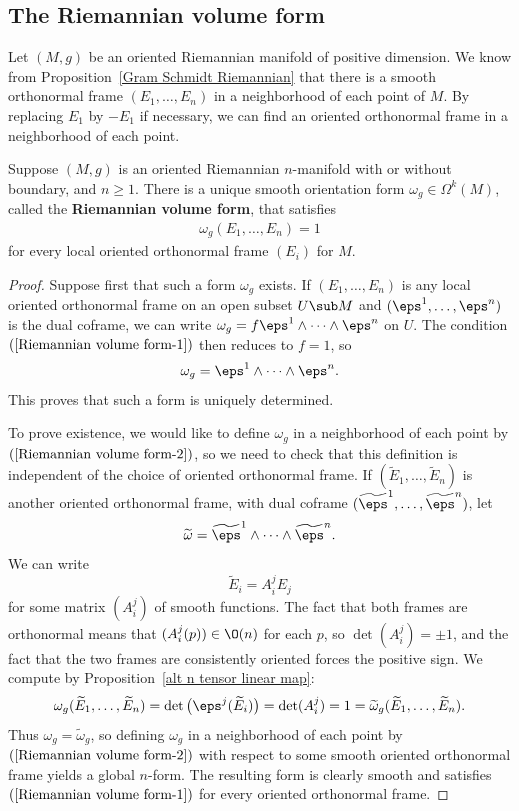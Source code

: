 \subsection{The Riemannian volume form}
Let $(M,g)$ be an oriented Riemannian manifold of positive dimension. We know from Proposition~\ref{Gram Schmidt Riemannian} that there is a smooth orthonormal frame $(E_1,\dots,E_n)$ in a neighborhood of each point of $M$. By replacing $E_1$ by $-E_1$ if necessary, we can find an oriented orthonormal frame in a neighborhood of each point.
\begin{proposition}\label{Riemannian volume form}
Suppose $(M,g)$ is an oriented Riemannian $n$-manifold with or without boundary, and $n\geq1$. There is a unique smooth orientation form $\omega_g\in\Omega^k(M)$, called the \textbf{Riemannian volume form}, that satisfies
\begin{align}\label{Riemannian volume form-1}
\omega_g(E_1,\dots,E_n)=1
\end{align}
for every local oriented orthonormal frame $(E_i)$ for $M$.
\end{proposition}
\begin{proof}
Suppose first that such a form $\omega_g$ exists. If $(E_1,\dots,E_n)$ is any local oriented orthonormal frame on an open subset $U\sub M$ and $(\eps^1,\dots,\eps^n)$ is the dual coframe, we can write $\omega_g=f\eps^1\wedge\cdots\wedge\eps^n$ on $U$. The condition $(\ref{Riemannian volume form-1})$ then reduces to $f=1$, so
\begin{align}\label{Riemannian volume form-2}
\omega_g=\eps^1\wedge\cdots\wedge\eps^n.
\end{align}
This proves that such a form is uniquely determined.\par
To prove existence, we would like to define $\omega_g$ in a neighborhood of each point
by $(\ref{Riemannian volume form-2})$, so we need to check that this definition is independent of the choice of oriented orthonormal frame. If $(\widetilde{E}_1,\dots,\widetilde{E}_n)$ is another oriented orthonormal frame, with dual coframe $(\widetilde{\eps}^1,\dots,\widetilde{\eps}^n)$, let
\[\widetilde{\omega}=\widetilde{\eps}^1\wedge\dots\wedge\widetilde{\eps}^n.\]
We can write
\[\widetilde{E}_i=A^j_iE_j\]
for some matrix $(A^j_i)$ of smooth functions. The fact that both frames are orthonormal means that $(A^j_i(p))\in\O(n)$ for each $p$, so $\det(A^j_i)=\pm 1$, and the fact that the two frames are consistently oriented forces the positive sign. We compute by Proposition~\ref{alt n tensor linear map}:
\[\omega_g(\widetilde{E}_1,\dots,\widetilde{E}_n)=\det\big(\eps^j(\widetilde{E}_i)\big)=\det(A^j_i)=1=\widetilde{\omega}_g(\widetilde{E}_1,\dots,\widetilde{E}_n).\]
Thus $\omega_g=\widetilde{\omega}_g$, so defining $\omega_g$ in a neighborhood of each point by $(\ref{Riemannian volume form-2})$ with respect to some smooth oriented orthonormal frame yields a global $n$-form. The resulting form is clearly smooth and satisfies $(\ref{Riemannian volume form-1})$ for every oriented orthonormal frame.
\end{proof}
